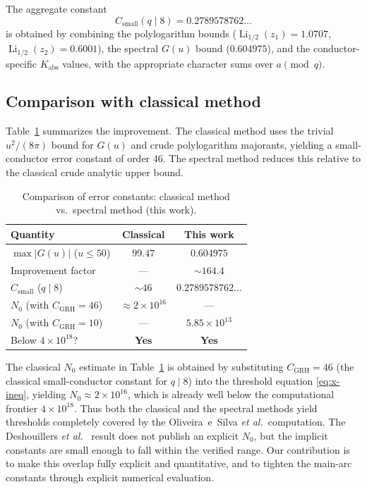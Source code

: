 \documentclass[11pt,a4paper]{article}
\theoremstyle{plain}
\theoremstyle{definition}
\theoremstyle{remark}
\numberwithin{equation}{section}
\numberwithin{table}{section}
\DeclareMathOperator{\Li}{Li}
\begin{document}
The aggregate constant
\begin{equation}
  C_{\mathrm{small}}(q\mid 8) = 0.2789578762\ldots
\end{equation}
is obtained by combining the polylogarithm bounds
($\Li_{1/2}(z_1)=1.0707$, $\Li_{1/2}(z_2)=0.6001$), the spectral
$G(u)$ bound ($0.604975$), and the conductor-specific $K_{\mathrm{abs}}$
values, with the appropriate character sums over $a\pmod q$.

\subsection{Comparison with classical method}

Table~\ref{tab:compare} summarizes the improvement.  The classical
method uses the trivial $u^2/(8\pi)$ bound for $G(u)$ and crude
polylogarithm majorants, yielding a small-conductor error constant of
order $46$.  The spectral method reduces this relative to the classical crude analytic upper bound.

\begin{table}[htbp]
\centering
\caption{Comparison of error constants: classical method vs.\ spectral
method (this work).}
\label{tab:compare}
\begin{tabular}{lcc}
\toprule
\textbf{Quantity} & \textbf{Classical} & \textbf{This work} \\
\midrule
$\max|G(u)|$ ($u\le 50$)          & $99.47$  & $0.604975$ \\
Improvement factor                & ---      & $\sim 164.4$ \\
$C_{\mathrm{small}}$ ($q\mid 8$)  & $\sim 46$ & $0.2789578762\ldots$ \\
$N_0$ (with $C_{\mathrm{GRH}}=46$) & $\approx 2\times 10^{16}$ & --- \\
$N_0$ (with $C_{\mathrm{GRH}}=10$) & --- & $5.85\times 10^{13}$ \\
\midrule
Below $4\times 10^{18}$?           & \textbf{Yes} & \textbf{Yes} \\
\bottomrule
\end{tabular}
\end{table}

The classical $N_0$ estimate in Table~\ref{tab:compare} is obtained by
substituting $C_{\mathrm{GRH}}=46$ (the classical small-conductor
constant for $q\mid 8$) into the threshold equation
\eqref{eq:x-ineq}, yielding $N_0\approx 2\times 10^{16}$, which is
already well below the computational frontier $4\times 10^{18}$.
Thus both the classical and the spectral methods yield thresholds
completely covered by the Oliveira~e~Silva \emph{et al.}\ computation.
The Deshouillers \emph{et al.}\ \cite{Deshouillers1997} result does
not publish an explicit $N_0$, but the implicit constants are small
enough to fall within the verified range.  Our contribution is to make
this overlap fully explicit and quantitative, and to tighten the main-arc
constants through explicit numerical evaluation.
\end{document}
